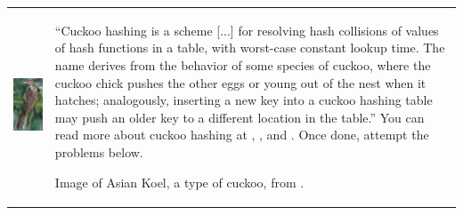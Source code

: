 \documentclass[addpoints]{exam}
\begin{document}
\begin{questions}
\begin{solution}
  \end{solution}

  \begin{tabularx}{1.0\linewidth}{lX}
  \includegraphics[width=.15\textwidth,align=t]{koel}
    &
      ``Cuckoo hashing is a scheme [...] for resolving hash collisions of values of hash functions in a table, with worst-case constant lookup time. The name derives from the behavior of some species of cuckoo, where the cuckoo chick pushes the other eggs or young out of the nest when it hatches; analogously, inserting a new key into a cuckoo hashing table may push an older key to a different location in the table.'' \cite{wp_cuckoohash} You can read more about cuckoo hashing at \cite{cuckoo_stanford}, \cite{cuckoo_geeks}, and \cite{cuckoo_guide}. Once done, attempt the problems below.
      \vspace{30pt}
      
      Image of Asian Koel, a type of cuckoo, from \cite{wp_koel}.
  \end{tabularx}
\end{questions}
\end{document}
